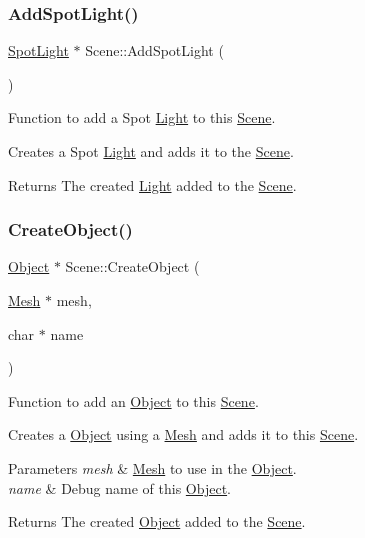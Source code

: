 \subsubsection{\texorpdfstring{Add\+Spot\+Light()}{AddSpotLight()}}
{\footnotesize\ttfamily \hyperlink{class_spot_light}{Spot\+Light} $\ast$ Scene\+::\+Add\+Spot\+Light (\begin{DoxyParamCaption}{ }\end{DoxyParamCaption})}



Function to add a Spot \hyperlink{class_light}{Light} to this \hyperlink{class_scene}{Scene}. 

Creates a Spot \hyperlink{class_light}{Light} and adds it to the \hyperlink{class_scene}{Scene}.

\begin{DoxyReturn}{Returns}
The created \hyperlink{class_light}{Light} added to the \hyperlink{class_scene}{Scene}. 
\end{DoxyReturn}
\mbox{\label{class_scene_adfdea29bf0ed9107c28f99fb8ebe34d1}} 
\subsubsection{\texorpdfstring{Create\+Object()}{CreateObject()}}
{\footnotesize\ttfamily \hyperlink{class_object}{Object} $\ast$ Scene\+::\+Create\+Object (\begin{DoxyParamCaption}\item[{\hyperlink{class_mesh}{Mesh} $\ast$}]{mesh,  }\item[{char $\ast$}]{name }\end{DoxyParamCaption})}



Function to add an \hyperlink{class_object}{Object} to this \hyperlink{class_scene}{Scene}. 

Creates a \hyperlink{class_object}{Object} using a \hyperlink{class_mesh}{Mesh} and adds it to this \hyperlink{class_scene}{Scene}.


\begin{DoxyParams}{Parameters}
{\em mesh} & \hyperlink{class_mesh}{Mesh} to use in the \hyperlink{class_object}{Object}. \\
\hline
{\em name} & Debug name of this \hyperlink{class_object}{Object}. \\
\hline
\end{DoxyParams}
\begin{DoxyReturn}{Returns}
The created \hyperlink{class_object}{Object} added to the \hyperlink{class_scene}{Scene}. 
\end{DoxyReturn}
\mbox{\label{class_scene_a660e1d1c0aebaff994ea6d36d1e9fec5}} 
